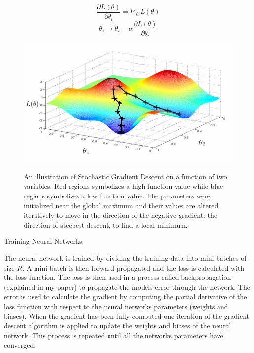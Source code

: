 \documentclass[17pt]{extarticle}
\newcommand*{\pd}[2]{\ensuremath{\dfrac{\partial #1}{\partial #2}}}
\begin{document}
\begin{equation*}\label{EQgradient}
\pd{L(\theta)}{\theta_i} = \nabla_{\theta_i} L(\theta)
\end{equation*}
\begin{equation*}\label{SGD}
{\theta_i} \to {\theta_i} - \alpha \pd{L(\theta)}{\theta_i}
\end{equation*}
\begin{figure}[h]
  		\includegraphics[scale=1.9]{gradient-descent.png}

{An illustration of Stochastic Gradient Descent on a function of two variables. Red regions symbolizes a high function value while blue regions symbolizes a low function value. The parameters were initialized near the global maximum and their values are altered iteratively to move in the direction of the negative gradient: the direction of steepest descent, to find a local minimum.}
\end{figure}

\newpage

\begin{center}
{\fontsize{40}{20}\selectfont Training Neural Networks}
\end{center}

The neural network is trained by dividing the training data into mini-batches of size $R$. A mini-batch is then forward propagated and the loss is calculated with the loss function. The loss is then used in a process called backpropagation (explained in my paper) to propagate the models error through the network. The error is used to calculate the gradient by computing the partial derivative of the loss function with respect to the neural networks parameters (weights and biases). When the gradient has been fully computed one iteration of the gradient descent algorithm is applied to update the weights and biases of the neural network. This process is repeated until all the networks parameters have converged.
  	
\end{document}
